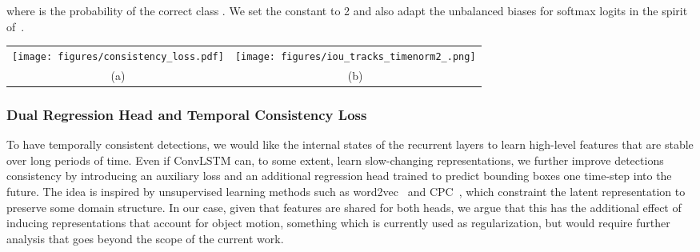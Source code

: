 \documentclass{article}
\newcommand{\comment}[1]{}
\begin{document}
where  is the probability of the correct class .
We set the constant  to 2 and also adapt the unbalanced biases for softmax logits in the spirit of~\cite{lin2017focal}.
\comment{
Then, the regression term of the loss is:

where  is the smooth  loss~\cite{liu2016ssd} averaged over the components of the input tensors. The classification loss instead is given by:

where  is the probability of the correct class, estimated with the softmax, and the constant  is set to 2.
We also adapt the unbalanced biases for softmax logits in the spirit of ~\cite{lin2017focal}.
}
\begin{figure*}[t]
    \centering
      \begin{tabular}{cc}
        \texttt{[image: figures/consistency\_loss.pdf]}&
        \texttt{[image: figures/iou\_tracks\_timenorm2\_.png]}\\
        \vspace{-2mm}
        (a)&
        (b)
	\end{tabular}
    \caption{(a) Detail of the box regression heads. In order to regularize temporally our network, we introduce a secondary regression head, predicting, at time , the boxes  for time . We impose predictions corresponding to the same time step to be consistent. (b) IoU between ground truth tracks and predicted boxes over time. The consistency loss helps obtaining more precise boxes.}
    \vspace{-5mm}
\label{fig:consistency}
\end{figure*}
\subsubsection{Dual Regression Head and Temporal Consistency Loss}
\label{subsec:consistency}
To have temporally consistent detections, we would like the 
internal states of the recurrent layers to learn high-level features that are stable over long periods of time.
Even if ConvLSTM can, to some extent, learn slow-changing representations, we further improve detections consistency by introducing an auxiliary loss and an additional regression head trained to predict bounding boxes one time-step into the future. 
The idea is inspired by unsupervised learning methods such as word2vec~\cite{word2vec} and CPC~\cite{cpc}, 
which constraint the latent representation to preserve some domain structure. 
In our case, given that features are shared for both heads, we argue that this has the 
additional effect of inducing representations that account for object motion, something
which is currently used as regularization, but would require further analysis that goes
beyond the scope of the current work.
\end{document}
